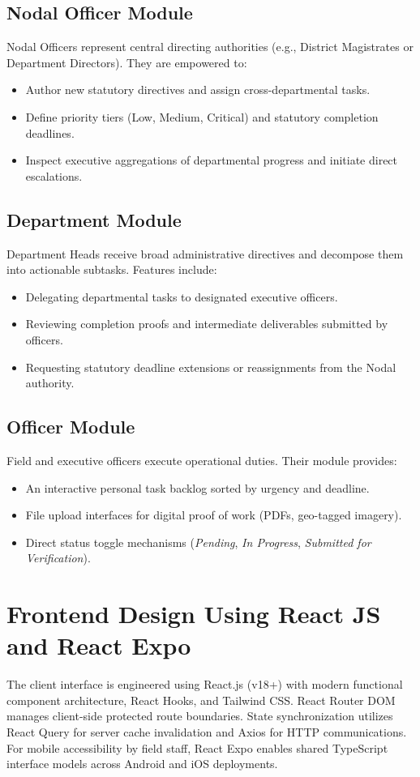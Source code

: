 \subsection{Nodal Officer Module}
Nodal Officers represent central directing authorities (e.g., District Magistrates or Department Directors). They are empowered to:
\begin{itemize}
    \item Author new statutory directives and assign cross-departmental tasks.
    \item Define priority tiers (Low, Medium, Critical) and statutory completion deadlines.
    \item Inspect executive aggregations of departmental progress and initiate direct escalations.
\end{itemize}

\subsection{Department Module}
Department Heads receive broad administrative directives and decompose them into actionable subtasks. Features include:
\begin{itemize}
    \item Delegating departmental tasks to designated executive officers.
    \item Reviewing completion proofs and intermediate deliverables submitted by officers.
    \item Requesting statutory deadline extensions or reassignments from the Nodal authority.
\end{itemize}

\subsection{Officer Module}
Field and executive officers execute operational duties. Their module provides:
\begin{itemize}
    \item An interactive personal task backlog sorted by urgency and deadline.
    \item File upload interfaces for digital proof of work (PDFs, geo-tagged imagery).
    \item Direct status toggle mechanisms (\textit{Pending}, \textit{In Progress}, \textit{Submitted for Verification}).
\end{itemize}

\section{Frontend Design Using React JS and React Expo}
\label{sec:frontend_design}
The client interface is engineered using React.js (v18+) with modern functional component architecture, React Hooks, and Tailwind CSS. React Router DOM manages client-side protected route boundaries. State synchronization utilizes React Query for server cache invalidation and Axios for HTTP communications. For mobile accessibility by field staff, React Expo enables shared TypeScript interface models across Android and iOS deployments.

